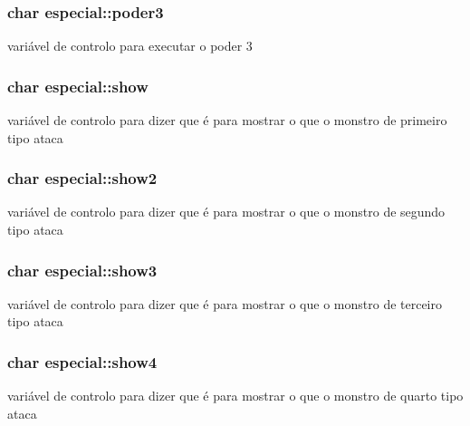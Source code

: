 \subsubsection[{\texorpdfstring{poder3}{poder3}}]{\setlength{\rightskip}{0pt plus 5cm}char especial\+::poder3}\hypertarget{structespecial_a322518f66509ede796d2d52d8424f4d0}{}\label{structespecial_a322518f66509ede796d2d52d8424f4d0}
variável de controlo para executar o poder 3 
\subsubsection[{\texorpdfstring{show}{show}}]{\setlength{\rightskip}{0pt plus 5cm}char especial\+::show}\hypertarget{structespecial_af031f31012955a6cfeae61fe3dae82dc}{}\label{structespecial_af031f31012955a6cfeae61fe3dae82dc}
variável de controlo para dizer que é para mostrar o que o monstro de primeiro tipo ataca 
\subsubsection[{\texorpdfstring{show2}{show2}}]{\setlength{\rightskip}{0pt plus 5cm}char especial\+::show2}\hypertarget{structespecial_aa1054ec08d0d79cdecc5276b48eee99a}{}\label{structespecial_aa1054ec08d0d79cdecc5276b48eee99a}
variável de controlo para dizer que é para mostrar o que o monstro de segundo tipo ataca 
\subsubsection[{\texorpdfstring{show3}{show3}}]{\setlength{\rightskip}{0pt plus 5cm}char especial\+::show3}\hypertarget{structespecial_a3a63cb0e37bfbdb7ed78f4daacb985a3}{}\label{structespecial_a3a63cb0e37bfbdb7ed78f4daacb985a3}
variável de controlo para dizer que é para mostrar o que o monstro de terceiro tipo ataca 
\subsubsection[{\texorpdfstring{show4}{show4}}]{\setlength{\rightskip}{0pt plus 5cm}char especial\+::show4}\hypertarget{structespecial_abc3893cf0d346b82f4747d9ccb25bcca}{}\label{structespecial_abc3893cf0d346b82f4747d9ccb25bcca}
variável de controlo para dizer que é para mostrar o que o monstro de quarto tipo ataca 
